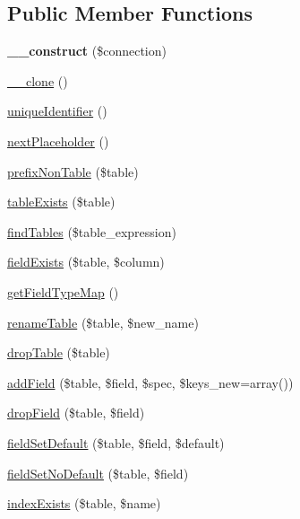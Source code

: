 \subsection*{Public Member Functions}
\begin{DoxyCompactItemize}
\item 
\hypertarget{classDatabaseSchema_a8dbadc4c37f3232abea2d64667329223}{
{\bfseries \_\-\_\-construct} (\$connection)}
\label{classDatabaseSchema_a8dbadc4c37f3232abea2d64667329223}

\item 
\hyperlink{classDatabaseSchema_a31371e9f44ef54d75fce3746b83a5d76}{\_\-\_\-clone} ()
\item 
\hyperlink{classDatabaseSchema_a50324931213b40d68037c184a0061cf0}{uniqueIdentifier} ()
\item 
\hyperlink{classDatabaseSchema_a25bdbd4eb743fcd4db4809451ad5e8c9}{nextPlaceholder} ()
\item 
\hyperlink{classDatabaseSchema_a6ed5776d1fdc2790123dd5e03571ba77}{prefixNonTable} (\$table)
\item 
\hyperlink{classDatabaseSchema_acf4650f58bed6fc76d94d49a72e5d706}{tableExists} (\$table)
\item 
\hyperlink{classDatabaseSchema_aecbf376fb9d85811278ee6448e99feca}{findTables} (\$table\_\-expression)
\item 
\hyperlink{classDatabaseSchema_a1f657a73ea94b4fa0de1d1954350b4e7}{fieldExists} (\$table, \$column)
\item 
\hyperlink{classDatabaseSchema_a82022c76c3131c4d745736d08321b788}{getFieldTypeMap} ()
\item 
\hyperlink{classDatabaseSchema_aaa0b6f32797505bdfc9ed953e10a486e}{renameTable} (\$table, \$new\_\-name)
\item 
\hyperlink{classDatabaseSchema_a61a37e713374b88d28161e0ade1a5c78}{dropTable} (\$table)
\item 
\hyperlink{classDatabaseSchema_a54800af6c4094cea196e1c66b5106c99}{addField} (\$table, \$field, \$spec, \$keys\_\-new=array())
\item 
\hyperlink{classDatabaseSchema_a9eee3ae81e40bba206015a83450e1d56}{dropField} (\$table, \$field)
\item 
\hyperlink{classDatabaseSchema_a0e7b9c13344b59584bf6e1ddea009592}{fieldSetDefault} (\$table, \$field, \$default)
\item 
\hyperlink{classDatabaseSchema_ae4de35c98eed09a4c38d82e3f17ed8a6}{fieldSetNoDefault} (\$table, \$field)
\item 
\hyperlink{classDatabaseSchema_ae343d2fd453d51d9df43d439af0a22e2}{indexExists} (\$table, \$name)

\end{DoxyCompactItemize}

